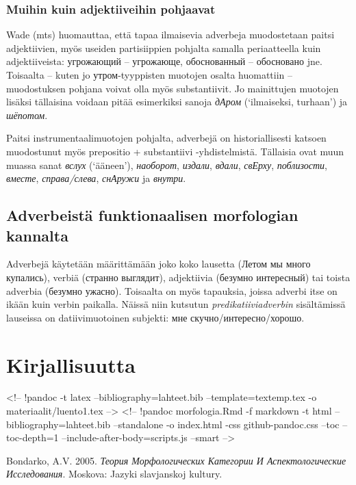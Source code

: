 \documentclass[]{scrartcl}
\begin{document}
\subsubsection{Muihin kuin adjektiiveihin
pohjaavat}\label{muihin-kuin-adjektiiveihin-pohjaavat}

Wade (mts) huomauttaa, että tapaa ilmaisevia adverbeja muodostetaan
paitsi adjektiivien, myös useiden partisiippien pohjalta samalla
periaatteella kuin adjektiiveista: угрожающий -- угрожающе, обоснованный
-- обосновано jne. Toisaalta -- kuten jo утром-tyyppisten muotojen
osalta huomattiin -- muodostuksen pohjana voivat olla myös
substantiivit. Jo mainittujen muotojen lisäksi tällaisina voidaan pitää
esimerkiksi sanoja \emph{дАром} (`ilmaiseksi, turhaan') ja
\emph{шёпотом}.

Paitsi instrumentaalimuotojen pohjalta, adverbejä on historiallisesti
katsoen muodostunut myös prepositio + substantiivi -yhdistelmistä.
Tällaisia ovat muun muassa sanat \emph{вслух} (`ääneen'),
\emph{наоборот}, \emph{издали}, \emph{вдали}, \emph{свЕрху},
\emph{поблизости}, \emph{вместе}, \emph{справа/слева}, \emph{снАружи} ja
\emph{внутри}.

\subsection{Adverbeistä funktionaalisen morfologian
kannalta}\label{adverbeistuxe4-funktionaalisen-morfologian-kannalta}

Adverbejä käytetään määrittämään joko koko lausetta (Летом мы много
купались), verbiä (странно выглядит), adjektiivia (безумно интересный)
tai toista adverbia (безумно ужасно). Toisaalta on myös tapauksia,
joissa adverbi itse on ikään kuin verbin paikalla. Näissä niin kutsutun
\emph{predikatiiviadverbin} sisältämissä lauseissa on datiivimuotoinen
subjekti: мне скучно/интересно/хорошо.

\section{Kirjallisuutta}\label{kirjallisuutta}

\textless{}!-- !pandoc -t latex --bibliography=lahteet.bib
--template=textemp.tex -o materiaalit/luento1.tex --\textgreater{}
\textless{}!-- !pandoc morfologia.Rmd -f markdown -t html
--bibliography=lahteet.bib --standalone -o index.html -css
github-pandoc.css --toc --toc-depth=1 --include-after-body=scripts.js
--smart --\textgreater{}

Bondarko, A.V. 2005. \emph{Теория Морфологических Категории И
Аспектологические Исследования}. Moskova: Jazyki slavjanskoj kultury.
\end{document}
